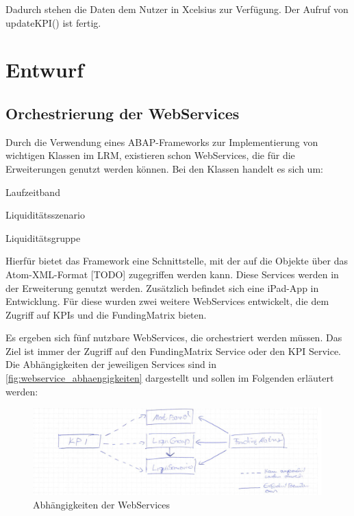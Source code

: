 Dadurch stehen die Daten dem Nutzer in Xcelsius zur Verfügung. Der Aufruf von updateKPI() ist fertig.

\newpage
\section{Entwurf}

\subsection{Orchestrierung der WebServices}
Durch die Verwendung eines ABAP-Frameworks zur Implementierung von wichtigen Klassen im LRM, existieren schon WebServices, die für die Erweiterungen genutzt werden können. Bei den Klassen handelt es sich um:

\begin{seList}
\item Laufzeitband
\item Liquiditätsszenario
\item Liquiditätsgruppe
\end{seList}

Hierfür bietet das Framework eine Schnittstelle, mit der auf die Objekte über das Atom-XML-Format [TODO] zugegriffen werden kann. Diese Services werden in der Erweiterung genutzt werden. Zusätzlich befindet sich eine iPad-App in Entwicklung. Für diese wurden zwei weitere WebServices entwickelt, die dem Zugriff auf KPIs und die FundingMatrix bieten.

Es ergeben sich fünf nutzbare WebServices, die orchestriert werden müssen. Das Ziel ist immer der Zugriff auf den FundingMatrix Service oder den KPI Service. Die Abhängigkeiten der jeweiligen Services sind in \vref{fig:webservice_abhaengigkeiten} dargestellt und sollen im Folgenden erläutert werden:

\begin{figure}[h]
\centering
\setlength{\unitlength}{1mm}
\includegraphics[width=15cm]{images/WebService-Abhaengigkeiten.jpg}
\caption{Abhängigkeiten der WebServices\label{fig:webservice_abhaengigkeiten}}
\end{figure}

